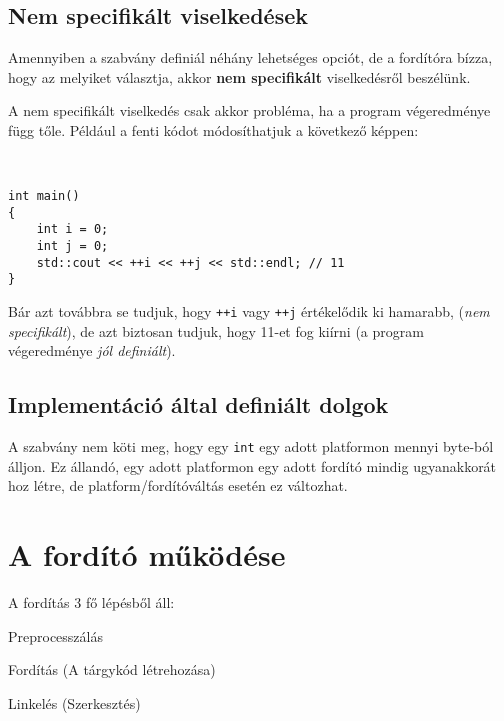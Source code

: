 \documentclass[a4paper,11.5pt]{article}
\begin{document}
	\subsection{Nem specifikált viselkedések}
	Amennyiben a szabvány definiál néhány lehetséges opciót, de a fordítóra bízza, hogy az melyiket választja, akkor \textbf{nem specifikált} viselkedésről beszélünk.
	
	A nem specifikált viselkedés csak akkor probléma, ha a program végeredménye függ tőle. Például a fenti kódot módosíthatjuk a következő képpen:
	
	\begin{example}\ 
		
		\begin{lstlisting}
int main()
{
	int i = 0;
	int j = 0;
	std::cout << ++i << ++j << std::endl; // 11
}
		\end{lstlisting}
	\end{example}
	Bár azt továbbra se tudjuk, hogy \texttt{++i} vagy \texttt{++j} értékelődik ki hamarabb, (\textit{nem specifikált}), de azt biztosan tudjuk, hogy 11-et fog kiírni (a program végeredménye \textit{jól definiált}).
	\subsection{Implementáció által definiált dolgok}
	A szabvány nem köti meg, hogy egy \texttt{int} egy adott platformon mennyi byte-ból álljon. Ez állandó, egy adott platformon egy adott fordító mindig ugyanakkorát hoz létre, de platform/fordítóváltás esetén ez változhat.
	
	\section{A fordító működése}
	A fordítás 3 fő lépésből áll:
	\begin{compactenum}
		\item Preprocesszálás
		\item Fordítás (A tárgykód létrehozása)
		\item Linkelés (Szerkesztés)
	\end{compactenum}
	
\end{document}
